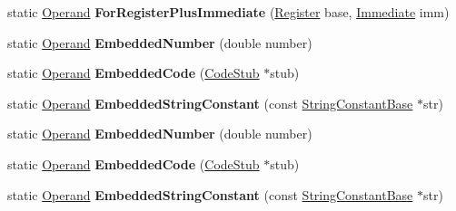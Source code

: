 \begin{DoxyCompactItemize}
static \mbox{\hyperlink{classv8_1_1internal_1_1Operand}{Operand}} {\bfseries For\+Register\+Plus\+Immediate} (\mbox{\hyperlink{classv8_1_1internal_1_1Register}{Register}} base, \mbox{\hyperlink{classv8_1_1internal_1_1Immediate}{Immediate}} imm)
\item 
\mbox{\label{classv8_1_1internal_1_1Operand_acf6f1fd77d9ac5d43608db185e9ee29b}} 
static \mbox{\hyperlink{classv8_1_1internal_1_1Operand}{Operand}} {\bfseries Embedded\+Number} (double number)
\item 
\mbox{\label{classv8_1_1internal_1_1Operand_a3c9527809810de0034efe67b914f9ee1}} 
static \mbox{\hyperlink{classv8_1_1internal_1_1Operand}{Operand}} {\bfseries Embedded\+Code} (\mbox{\hyperlink{classv8_1_1internal_1_1CodeStub}{Code\+Stub}} $\ast$stub)
\item 
\mbox{\label{classv8_1_1internal_1_1Operand_aed8c3e6c09f724bdfb40c4705b89bc83}} 
static \mbox{\hyperlink{classv8_1_1internal_1_1Operand}{Operand}} {\bfseries Embedded\+String\+Constant} (const \mbox{\hyperlink{classv8_1_1internal_1_1StringConstantBase}{String\+Constant\+Base}} $\ast$str)
\item 
\mbox{\label{classv8_1_1internal_1_1Operand_acf6f1fd77d9ac5d43608db185e9ee29b}} 
static \mbox{\hyperlink{classv8_1_1internal_1_1Operand}{Operand}} {\bfseries Embedded\+Number} (double number)
\item 
\mbox{\label{classv8_1_1internal_1_1Operand_a3c9527809810de0034efe67b914f9ee1}} 
static \mbox{\hyperlink{classv8_1_1internal_1_1Operand}{Operand}} {\bfseries Embedded\+Code} (\mbox{\hyperlink{classv8_1_1internal_1_1CodeStub}{Code\+Stub}} $\ast$stub)
\item 
\mbox{\label{classv8_1_1internal_1_1Operand_aed8c3e6c09f724bdfb40c4705b89bc83}} 
static \mbox{\hyperlink{classv8_1_1internal_1_1Operand}{Operand}} {\bfseries Embedded\+String\+Constant} (const \mbox{\hyperlink{classv8_1_1internal_1_1StringConstantBase}{String\+Constant\+Base}} $\ast$str)
\item 
\mbox{\label{classv8_1_1internal_1_1Operand_af63e5b52f98f22839e89fd46fb9a412b}} 

\end{DoxyCompactItemize}
